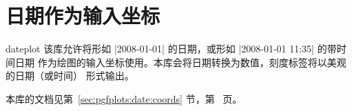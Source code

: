 
\section{日期作为输入坐标}

\begin{pgfplotslibrary}{dateplot}
    该库允许将形如 |2008-01-01| 的日期，或形如 |2008-01-01 11:35| 的带时间日期
    作为绘图的输入坐标使用。本库会将日期转换为数值，刻度标签将以美观的日期（或时间）
    形式输出。

    本库的文档见第~\ref{sec:pgfplots:date:coords} 节，第~\pageref{sec:pgfplots:date:coords} 页。
\end{pgfplotslibrary}
